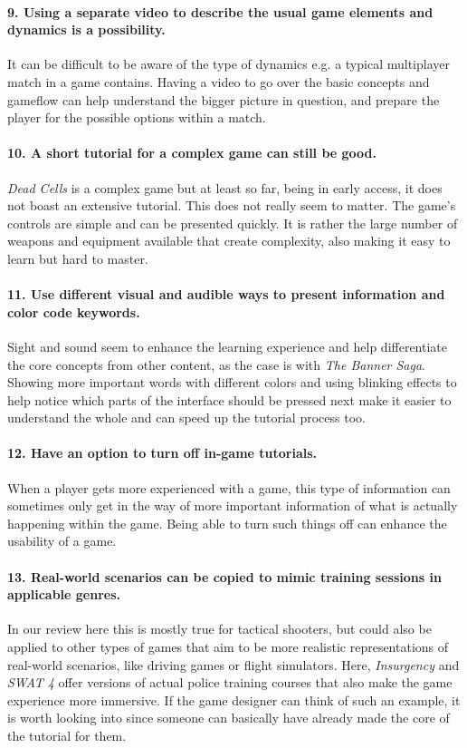 \paragraph{9. Using a separate video to describe the usual game elements and dynamics is a possibility.}
It can be difficult to be aware of the type of dynamics e.g. a typical multiplayer match in a game contains. Having a video to go over the basic concepts and gameflow can help understand the bigger picture in question, and prepare the player for the possible options within a match.
\paragraph{10. A short tutorial for a complex game can still be good.}
\textit{Dead Cells} is a complex game but at least so far, being in early access, it does not boast an extensive tutorial. This does not really seem to matter. The game's controls are simple and can be presented quickly. It is rather the large number of weapons and equipment available that create complexity, also making it easy to learn but hard to master. 
\paragraph{11. Use different visual and audible ways to present information and color code keywords.}
Sight and sound seem to enhance the learning experience and help differentiate the core concepts from other content, as the case is with \textit{The Banner Saga}. Showing more important words with different colors and using blinking effects to help notice which parts of the interface should be pressed next make it easier to understand the whole and can speed up the tutorial process too.
\paragraph{12. Have an option to turn off in-game tutorials.}
When a player gets more experienced with a game, this type of information can sometimes only get in the way of more important information of what is actually happening within the game. Being able to turn such things off can enhance the usability of a game.
\paragraph{13. Real-world scenarios can be copied to mimic training sessions in applicable genres.} In our review here this is mostly true for tactical shooters, but could also be applied to other types of games that aim to be more realistic representations of real-world scenarios, like driving games or flight simulators. Here, \textit{Insurgency} and \textit{SWAT 4} offer versions of actual police training courses that also make the game experience more immersive. If the game designer can think of such an example, it is worth looking into since someone can basically have already made the core of the tutorial for them.

